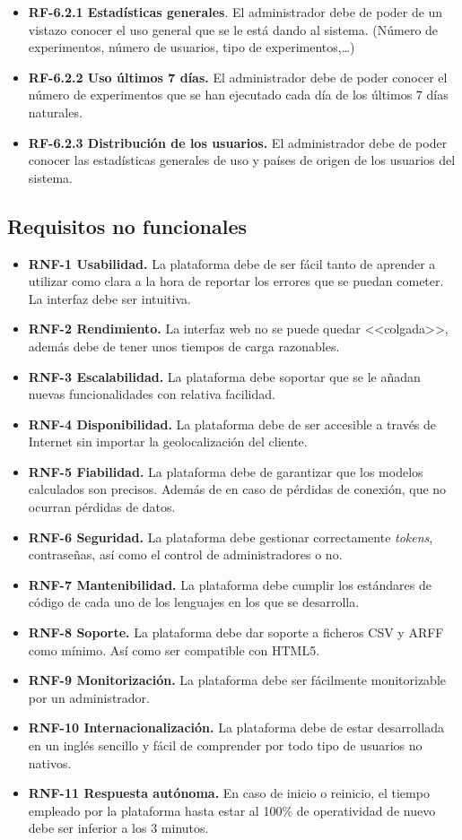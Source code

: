 \begin{itemize}
\begin{itemize}
\begin{itemize}
		\item \textbf{RF-6.2.1 Estadísticas generales}. El administrador debe de poder de un vistazo conocer el uso general que se le está dando al sistema. (Número de experimentos, número de usuarios, tipo de experimentos,\dots)
		\item \textbf{RF-6.2.2 Uso últimos 7 días.} El administrador debe de poder conocer el número de experimentos que se han ejecutado cada día de los últimos 7 días naturales.
		\item \textbf{RF-6.2.3 Distribución de los usuarios.} El administrador debe de poder conocer las estadísticas generales de uso y países de origen de los usuarios del sistema.
	\end{itemize}
	\end{itemize}
\end{itemize}
\pagebreak
\subsection{Requisitos no funcionales}\label{requisitos-no-funcionales}
\begin{itemize}
\item \textbf{RNF-1 Usabilidad.} La plataforma debe de ser fácil tanto de aprender a utilizar como clara a la hora de reportar los errores que se puedan cometer. La interfaz debe ser intuitiva.
\item \textbf{RNF-2 Rendimiento.} La interfaz web no se puede quedar <<colgada>>, además debe de tener unos tiempos de carga razonables.
\item \textbf{RNF-3 Escalabilidad.} La plataforma debe soportar que se le añadan nuevas funcionalidades con relativa facilidad.
\item \textbf{RNF-4 Disponibilidad.} La plataforma debe de ser accesible a través de Internet sin importar la geolocalización del cliente.
\item \textbf{RNF-5 Fiabilidad.} La plataforma debe de garantizar que los modelos calculados son precisos. Además de en caso de pérdidas de conexión, que no ocurran pérdidas de datos.
\item \textbf{RNF-6 Seguridad.} La plataforma debe gestionar correctamente \textit{tokens}, contraseñas, así como el control de administradores o no.
\item \textbf{RNF-7 Mantenibilidad.} La plataforma debe cumplir los estándares de código de cada uno de los lenguajes en los que se desarrolla. 
\item \textbf{RNF-8 Soporte.} La plataforma debe dar soporte a ficheros CSV y ARFF como mínimo. Así como ser compatible con HTML5.
\item \textbf{RNF-9 Monitorización.} La plataforma debe ser fácilmente monitorizable por un administrador.
\item \textbf{RNF-10 Internacionalización.} La plataforma debe de estar desarrollada en un inglés sencillo y fácil de comprender por todo tipo de usuarios no nativos.
\item \textbf{RNF-11 Respuesta autónoma.} En caso de inicio o reinicio, el tiempo empleado por la plataforma hasta estar al 100\% de operatividad de nuevo debe ser inferior a los 3 minutos.
\end{itemize}
\newpage
